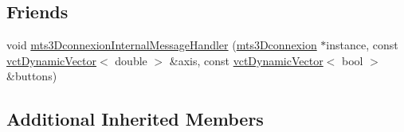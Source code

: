 \subsection*{Friends}
\begin{DoxyCompactItemize}
\item 
void \hyperlink{classmts3_dconnexion_a8ba8017eb952f921be59d423f6de3f14}{mts3\-Dconnexion\-Internal\-Message\-Handler} (\hyperlink{classmts3_dconnexion}{mts3\-Dconnexion} $\ast$instance, const \hyperlink{classvct_dynamic_vector}{vct\-Dynamic\-Vector}$<$ double $>$ \&axis, const \hyperlink{classvct_dynamic_vector}{vct\-Dynamic\-Vector}$<$ bool $>$ \&buttons)
\end{DoxyCompactItemize}
\subsection*{Additional Inherited Members}


